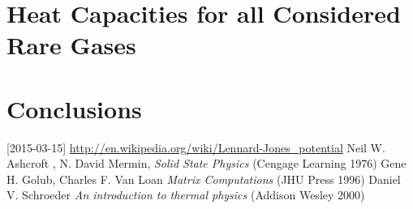 \documentclass[11pt]{article}
\newlength\figureheight
\newlength\figurewidth
\newif\iftikz
\begin{document}
\newpage
\section{Heat Capacities for all Considered Rare Gases}
\iftikz
\begin{figure}[H]
	\centering
	\setlength\figureheight{16cm} 
	\setlength\figurewidth{14cm}
	
	\caption{The dispersion relation plotted in different symmetry directions for different rare gases.}
	\label{fig:Cv}
\end{figure}
\fi


\section{Conclusions}
\begin{thebibliography}{99}
 [2015-03-15] \url{http://en.wikipedia.org/wiki/Lennard-Jones_potential}
 Neil W. Ashcroft , N. David Mermin, \textit{Solid State Physics} (Cengage Learning 1976)
 Gene H. Golub, Charles F. Van Loan \textit{Matrix Computations} (JHU Press 1996)
 Daniel V. Schroeder \textit{An introduction to thermal physics} (Addison Wesley 2000)
\end{thebibliography}
\end{document}
